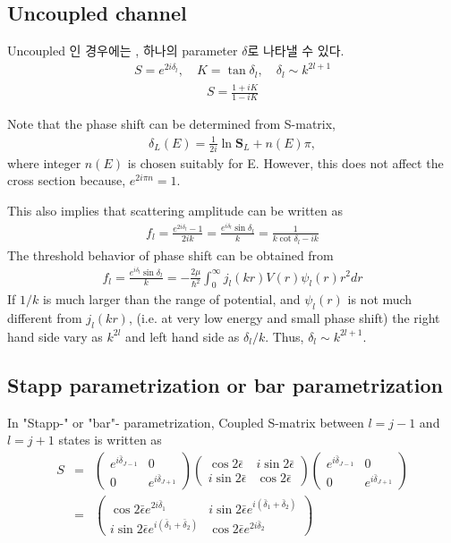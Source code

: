 \documentclass[10pt]{article}
\def\bm{\boldsymbol}
\newcommand{\bea}{\begin{eqnarray}}
\newcommand{\eea}{\end{eqnarray}}
\newcommand{\no}{\nonumber \\}
\begin{document}
\subsection{Uncoupled channel}
Uncoupled 인 경우에는 , 하나의 parameter $\delta$로 나타낼 수 있다.
\bea
S=e^{2i\delta_l}, \quad K=\tan\delta_l,\quad \delta_l\sim k^{2l+1}
\eea 
\bea
S=\frac{1+i K}{1-i K}
\eea

Note that the phase shift can be determined from S-matrix,
\bea
\delta_L(E)=\frac{1}{2i}\ln {\bm S}_L +n(E)\pi,
\eea
where integer $n(E)$ is chosen suitably for E.
However, this does not affect the cross section because,
$e^{2i\pi n}=1$. 

This also implies that scattering amplitude can be written as
\bea
f_l=\frac{e^{2i\delta_l}-1}{2ik}=\frac{e^{i\delta_l}\sin\delta_l}{k}=
   \frac{1}{k\cot\delta_l-ik }
\eea 
The threshold behavior of phase shift can be obtained from
\bea
f_l=\frac{e^{i\delta_l}\sin\delta_l}{k}
=-\frac{2\mu}{\hbar^2}\int_0^\infty j_l(kr) V(r) \psi_l(r) r^2 dr
\eea 
If $1/k$ is much larger than the range of potential,
and $\psi_l(r)$ is not much different from $j_l(kr)$, 
(i.e. at very low energy and small phase shift)
the right hand side vary as $k^{2l}$ and left hand side as $\delta_l/k$.
Thus, $\delta_l\sim k^{2l+1}$.


\subsection{Stapp parametrization or bar parametrization}
In "Stapp-" or "bar"- parametrization, 
Coupled S-matrix between $l=j-1$ and $l=j+1$ states
is written as
\bea
S&=&\left(
\begin{array}{cc}
e^{i\bar{\delta}_{J-1}} & 0\\ 0 & e^{i\bar{\delta}_{J+1}}
\end{array}
\right)
\left(
\begin{array}{cc}
\cos2\bar{\epsilon} & i\sin2\bar{\epsilon} \\
i\sin2\bar{\epsilon} & \cos2\bar{\epsilon}
\end{array}
\right)
\left(
\begin{array}{cc}
e^{i\bar{\delta}_{J-1}} & 0\\ 0 & e^{i\bar{\delta}_{J+1}}
\end{array}
\right) \no
&=&\left(
\begin{array}{cc}
\cos 2\bar{\epsilon} e^{2i\bar{\delta}_1} & i\sin 2\bar{\epsilon} e^{i(\bar{\delta}_1+\bar{\delta}_2)} \\
i\sin 2\bar{\epsilon} e^{i(\bar{\delta}_1+\bar{\delta}_2)} & \cos 2\bar{\epsilon} e^{2i\bar{\delta}_2}
\end{array}
\right)
\eea
\end{document}
